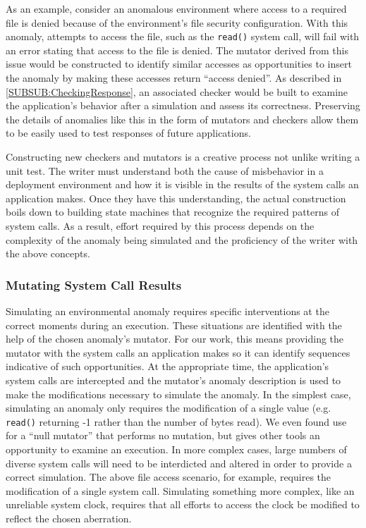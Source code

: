 As an example, consider
an anomalous environment
where access to a required file is denied because of
the environment's file security configuration.
With this anomaly,
attempts to access the file,
such as
the {\tt read()} system call,
will fail with an error stating that access to the file is denied.
The mutator derived from this issue would be constructed to
identify similar accesses as opportunities
to insert the anomaly
by making these
accesses return ``access denied''.
As described in \ref{SUBSUB:CheckingResponse},
an associated checker would be built to
examine the application's behavior after a simulation and assess its
correctness.
Preserving the details of anomalies like this in the form of
mutators and checkers
allow them to be
easily used
to test responses of future applications.

Constructing new checkers and mutators is a creative process not unlike
writing a unit test.  The writer must understand both the cause of
misbehavior in a deployment environment and how it is visible in the
results of the system calls an application makes.  Once they have this
understanding, the actual construction boils down to building state
machines that recognize the required patterns of system calls.  As a
result, effort required by this process depends on the complexity of the
anomaly being simulated and the proficiency of the writer with the above
concepts.

\subsubsection{Mutating System Call Results}
\label{SUBSUB:MutatingCommunications}
Simulating an environmental anomaly requires specific interventions at the
correct moments during an execution.
These situations are identified
with the help of the chosen anomaly's
mutator.
For our work,
this means providing
the mutator
with the system calls
an application makes
so it can identify sequences
indicative of such opportunities.
At the appropriate time,
the application's system calls
are intercepted
and the mutator's anomaly description is used to
make the modifications necessary
to simulate the anomaly.
In the simplest case,
simulating an anomaly only requires
the modification of a single value
(e.g. {\tt read()} returning -1 rather than the number of bytes read).
We even found use for a ``null mutator''
that performs no mutation, but gives other tools an opportunity to examine an execution.
In more complex cases,
large numbers of diverse system calls
will need to be interdicted and altered
in order to provide a correct simulation.
The above file access scenario, for example,
requires the modification of a single system call.
Simulating something more complex,
like an unreliable system clock,
requires that all efforts
to access the clock
be modified to reflect the chosen aberration.

